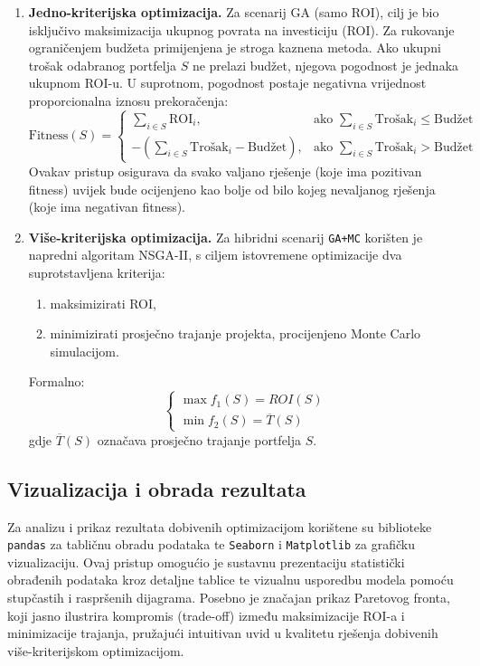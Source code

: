 \begin{enumerate}
    \item \textbf{Jedno-kriterijska optimizacija.}  
Za scenarij GA (samo ROI), cilj je bio isključivo maksimizacija ukupnog povrata na investiciju (ROI). Za rukovanje ograničenjem budžeta primijenjena je stroga kaznena metoda. Ako ukupni trošak odabranog portfelja $S$ ne prelazi budžet, njegova pogodnost je jednaka ukupnom ROI-u. U suprotnom, pogodnost postaje negativna vrijednost proporcionalna iznosu prekoračenja:
$$
\text{Fitness}(S) = 
\begin{cases}
    \sum_{i \in S} \text{ROI}_i, & \text{ako } \sum_{i \in S} \text{Trošak}_i \leq \text{Budžet} \\
    -\left(\sum_{i \in S} \text{Trošak}_i - \text{Budžet}\right), & \text{ako } \sum_{i \in S} \text{Trošak}_i > \text{Budžet}
\end{cases}
$$
Ovakav pristup osigurava da svako valjano rješenje (koje ima pozitivan fitness) uvijek bude ocijenjeno kao bolje od bilo kojeg nevaljanog rješenja (koje ima negativan fitness).    \item \textbf{Više-kriterijska optimizacija.}  
    Za hibridni scenarij \texttt{GA+MC} korišten je napredni algoritam NSGA-II, s ciljem istovremene optimizacije dva suprotstavljena kriterija:
    \begin{enumerate}
        \item maksimizirati ROI,
        \item minimizirati prosječno trajanje projekta, procijenjeno Monte Carlo simulacijom.
    \end{enumerate}
    Formalno:
    \[
    \begin{cases}
    \max f_1(S) = ROI(S) \\
    \min f_2(S) = \overline{T}(S)
    \end{cases}
    \]
    gdje $\overline{T}(S)$ označava prosječno trajanje portfelja $S$.
\end{enumerate}


\subsection{Vizualizacija i obrada rezultata}

Za analizu i prikaz rezultata dobivenih optimizacijom korištene su biblioteke \texttt{pandas} za tabličnu obradu podataka te \texttt{Seaborn} i \texttt{Matplotlib} \cite{Waskom2021, Hunter2007} za grafičku vizualizaciju.
Ovaj pristup omogućio je sustavnu prezentaciju statistički obrađenih podataka kroz detaljne tablice te vizualnu usporedbu modela pomoću stupčastih i raspršenih dijagrama. Posebno je značajan prikaz Paretovog fronta, koji jasno ilustrira kompromis (trade-off) između maksimizacije ROI-a i minimizacije trajanja, pružajući intuitivan uvid u kvalitetu rješenja dobivenih više-kriterijskom optimizacijom.

